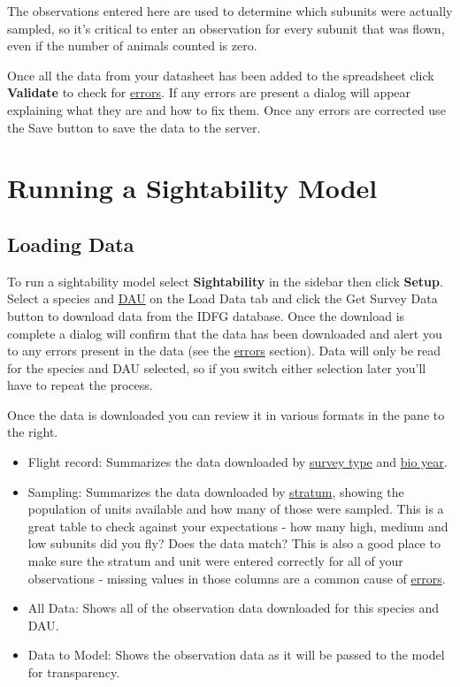 \documentclass[
]{book}
\providecommand{\tightlist}{%
  \setlength{\itemsep}{0pt}\setlength{\parskip}{0pt}}
\begin{document}
The observations entered here are used to determine which subunits were actually sampled, so it's critical to enter an observation for every subunit that was flown, even if the number of animals counted is zero.

Once all the data from your datasheet has been added to the spreadsheet click \textbf{Validate} to check for \protect\hyperlink{sight-errors}{errors}. If any errors are present a dialog will appear explaining what they are and how to fix them. Once any errors are corrected use the {Save} button to save the data to the server.

\hypertarget{sight-model}{%
\section{Running a Sightability Model}\label{sight-model}}

\hypertarget{sight-load}{%
\subsection{Loading Data}\label{sight-load}}

To run a sightability model select \textbf{Sightability} in the sidebar then click \textbf{Setup}. Select a species and \protect\hyperlink{gl-dau}{DAU} on the Load Data tab and click the {Get Survey Data} button to download data from the IDFG database. Once the download is complete a dialog will confirm that the data has been downloaded and alert you to any errors present in the data (see the \protect\hyperlink{sight-errors}{errors} section). Data will only be read for the species and DAU selected, so if you switch either selection later you'll have to repeat the process.

Once the data is downloaded you can review it in various formats in the pane to the right.

\begin{itemize}
\tightlist
\item
  Flight record: Summarizes the data downloaded by \protect\hyperlink{gl-comp-survey}{survey type} and \protect\hyperlink{gl-bio-year}{bio year}.
\item
  Sampling: Summarizes the data downloaded by \protect\hyperlink{gl-sight-stratum}{stratum}, showing the population of units available and how many of those were sampled. This is a great table to check against your expectations - how many high, medium and low subunits did you fly? Does the data match? This is also a good place to make sure the stratum and unit were entered correctly for all of your observations - missing values in those columns are a common cause of \protect\hyperlink{sight-errors}{errors}.
\item
  All Data: Shows all of the observation data downloaded for this species and DAU.
\item
  Data to Model: Shows the observation data as it will be passed to the model for transparency.
\end{itemize}
\end{document}
